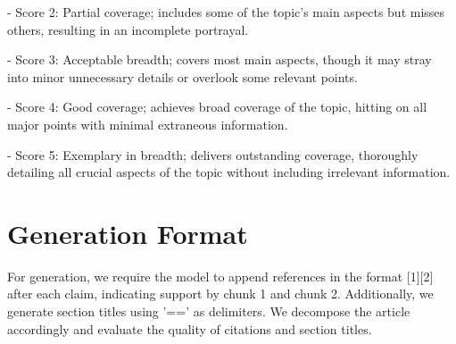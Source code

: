 \begin{tcolorbox}[title = {Criteria Description for Organization Score, Focus Score and Coverage Score}]
- Score 2: Partial coverage; includes some of the topic’s main aspects but misses others, resulting in an incomplete portrayal. 

- Score 3: Acceptable breadth; covers most main aspects, though it may stray into minor unnecessary details or overlook some relevant points. 

- Score 4: Good coverage; achieves broad coverage of the topic, hitting on all major points with minimal extraneous information.

- Score 5: Exemplary in breadth; delivers outstanding coverage, thoroughly detailing all crucial aspects of the topic without including irrelevant information.

\end{tcolorbox}


\newpage

\section{Generation Format}

For generation, we require the model to append references in the format [1][2] after each claim, indicating support by chunk 1 and chunk 2. Additionally, we generate section titles using '==' as delimiters. We decompose the article accordingly and evaluate the quality of citations and section titles.

